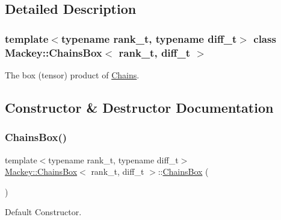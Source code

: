 \subsection{Detailed Description}
\subsubsection*{template$<$typename rank\+\_\+t, typename diff\+\_\+t$>$\newline
class Mackey\+::\+Chains\+Box$<$ rank\+\_\+t, diff\+\_\+t $>$}

The box (tensor) product of \hyperlink{classMackey_1_1Chains}{Chains}. 

\subsection{Constructor \& Destructor Documentation}
\mbox{\label{classMackey_1_1ChainsBox_aa5b4853612f378261b6d321da748f576}} 
\subsubsection{\texorpdfstring{Chains\+Box()}{ChainsBox()}\hspace{0.1cm}{\footnotesize\ttfamily [1/4]}}
{\footnotesize\ttfamily template$<$typename rank\+\_\+t, typename diff\+\_\+t$>$ \\
\hyperlink{classMackey_1_1ChainsBox}{Mackey\+::\+Chains\+Box}$<$ rank\+\_\+t, diff\+\_\+t $>$\+::\hyperlink{classMackey_1_1ChainsBox}{Chains\+Box} (\begin{DoxyParamCaption}{ }\end{DoxyParamCaption})\hspace{0.3cm}{\ttfamily [inline]}}



Default Constructor. 

\mbox{\label{classMackey_1_1ChainsBox_a7b0d2b56b2d775cc3776c45150eb1997}} 

